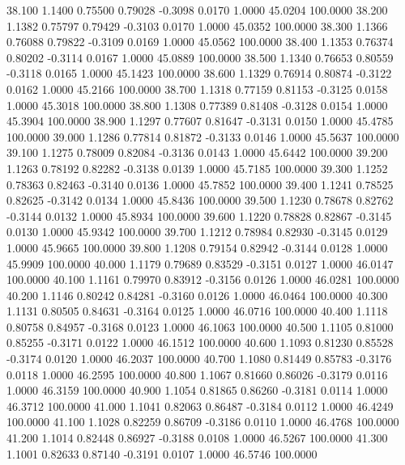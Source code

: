   38.100   1.1400   0.75500   0.79028  -0.3098   0.0170   1.0000  45.0204 100.0000
  38.200   1.1382   0.75797   0.79429  -0.3103   0.0170   1.0000  45.0352 100.0000
  38.300   1.1366   0.76088   0.79822  -0.3109   0.0169   1.0000  45.0562 100.0000
  38.400   1.1353   0.76374   0.80202  -0.3114   0.0167   1.0000  45.0889 100.0000
  38.500   1.1340   0.76653   0.80559  -0.3118   0.0165   1.0000  45.1423 100.0000
  38.600   1.1329   0.76914   0.80874  -0.3122   0.0162   1.0000  45.2166 100.0000
  38.700   1.1318   0.77159   0.81153  -0.3125   0.0158   1.0000  45.3018 100.0000
  38.800   1.1308   0.77389   0.81408  -0.3128   0.0154   1.0000  45.3904 100.0000
  38.900   1.1297   0.77607   0.81647  -0.3131   0.0150   1.0000  45.4785 100.0000
  39.000   1.1286   0.77814   0.81872  -0.3133   0.0146   1.0000  45.5637 100.0000
  39.100   1.1275   0.78009   0.82084  -0.3136   0.0143   1.0000  45.6442 100.0000
  39.200   1.1263   0.78192   0.82282  -0.3138   0.0139   1.0000  45.7185 100.0000
  39.300   1.1252   0.78363   0.82463  -0.3140   0.0136   1.0000  45.7852 100.0000
  39.400   1.1241   0.78525   0.82625  -0.3142   0.0134   1.0000  45.8436 100.0000
  39.500   1.1230   0.78678   0.82762  -0.3144   0.0132   1.0000  45.8934 100.0000
  39.600   1.1220   0.78828   0.82867  -0.3145   0.0130   1.0000  45.9342 100.0000
  39.700   1.1212   0.78984   0.82930  -0.3145   0.0129   1.0000  45.9665 100.0000
  39.800   1.1208   0.79154   0.82942  -0.3144   0.0128   1.0000  45.9909 100.0000
  40.000   1.1179   0.79689   0.83529  -0.3151   0.0127   1.0000  46.0147 100.0000
  40.100   1.1161   0.79970   0.83912  -0.3156   0.0126   1.0000  46.0281 100.0000
  40.200   1.1146   0.80242   0.84281  -0.3160   0.0126   1.0000  46.0464 100.0000
  40.300   1.1131   0.80505   0.84631  -0.3164   0.0125   1.0000  46.0716 100.0000
  40.400   1.1118   0.80758   0.84957  -0.3168   0.0123   1.0000  46.1063 100.0000
  40.500   1.1105   0.81000   0.85255  -0.3171   0.0122   1.0000  46.1512 100.0000
  40.600   1.1093   0.81230   0.85528  -0.3174   0.0120   1.0000  46.2037 100.0000
  40.700   1.1080   0.81449   0.85783  -0.3176   0.0118   1.0000  46.2595 100.0000
  40.800   1.1067   0.81660   0.86026  -0.3179   0.0116   1.0000  46.3159 100.0000
  40.900   1.1054   0.81865   0.86260  -0.3181   0.0114   1.0000  46.3712 100.0000
  41.000   1.1041   0.82063   0.86487  -0.3184   0.0112   1.0000  46.4249 100.0000
  41.100   1.1028   0.82259   0.86709  -0.3186   0.0110   1.0000  46.4768 100.0000
  41.200   1.1014   0.82448   0.86927  -0.3188   0.0108   1.0000  46.5267 100.0000
  41.300   1.1001   0.82633   0.87140  -0.3191   0.0107   1.0000  46.5746 100.0000
